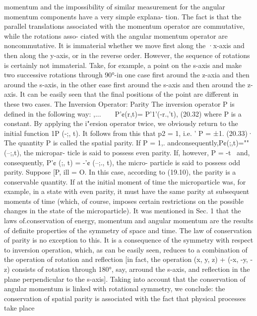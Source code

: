 \documentclass[a4paper,sfsidenotes,colorlinks=true]{tufte-book}
\numberwithin{equation}{section}
\numberwithin{figure}{section}
\begin{document}
{{    momentum and the impossibility of similar measurement for the
    angular momentum components have a very simple explana- tion. The
    fact is that the parallel translations associated with the
    momentum operator are commutative, while the rotations asso-
    ciated with the angular momentum operator are noncommutative. It
    is immaterial whether we move first along the ·x-axis and then
    along the y-axis, or in the reverse order.  However, the sequence
    of rotations is certainly not immaterial. Take, for example, a
    point on the s-axis and make two successive rotations through
    90°-in one case first around the z-axia and then around the
    s-axis, in the other ease first around the s-axis and then around
    the z-axis. It can be easily seen that the final positions of the
    point are different in these two cases.  The Inversion Operator:
    Parity The inversion operator P is defined in the following way:
    ,... ~ ~ P'¢(r,t)= P'1'(-r.,'t), (20.32) where P is a constant. By
    applying the i"ersion operator twice, we obviously return to the
    initial function 1P (-;, t).  It follows from this that p2 = 1,
    i.e. ' P = ±1. (20.33)· The quantity P is called the spatial
    parity. If P = 1,.  andconsequently,P¢(;,t)=""(--;,t), the
    micropar- ticle is said to possess even parity. If, however, P =
    -t~ and, consequently, P'¢ (;, t) = -'¢ (--;., t), the micro-
    particle is said to possess odd parity.  Suppose [P, ill = O. In
    this case, according to (19.10), the parity is a conservable
    quantity. If at the initial moment of time the microparticle was,
    for example, in a state with even parity, it must have the same
    parity at subsequent moments of time (which, of course, imposes
    certain restrictions on the possible changes in the state of the
    microparticle).  It was mentioned in Sec. 1 that the laws
    of.conservation of energy, momentum and angular momentum are the
    results of definite properties of the symmetry of space and
    time. The law of conservation of parity is no exception to
    this. It is a consequence of the symmetry with respect to
    inversion operation, which, as can be easily seen, reduces to a
    combination of the operation of rotation and reflection [in fact,
    the operation (x, y, z) + (-x, -y, -z) consists of rotation
    through 180°, say, arround the s-axis, and reflection in the plane
    perpendicular to the s-axis]. Taking into account that the
    conservation of angular momentum is linked with rotational
    symmetry, we conclude: the conservation of spatial parity is associated with the fact that physical processes take place
}}
\end{document}
